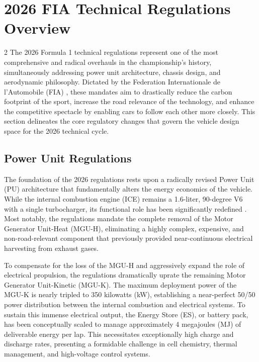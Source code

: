 \section{2026 FIA Technical Regulations Overview}

\begin{multicols}{2}
The 2026 Formula 1 technical regulations represent one of the most comprehensive and radical overhauls in the championship's history, simultaneously addressing power unit architecture, chassis design, and aerodynamic philosophy. Dictated by the Federation Internationale de l'Automobile (FIA) \cite{FIA_2026_Technical_Regulations}, these mandates aim to drastically reduce the carbon footprint of the sport, increase the road relevance of the technology, and enhance the competitive spectacle by enabling cars to follow each other more closely. This section delineates the core regulatory changes that govern the vehicle design space for the 2026 technical cycle.

\subsection{Power Unit Regulations}

The foundation of the 2026 regulations rests upon a radically revised Power Unit (PU) architecture that fundamentally alters the energy economics of the vehicle. While the internal combustion engine (ICE) remains a 1.6-liter, 90-degree V6 with a single turbocharger, its functional role has been significantly redefined \cite{FIA_2026_PU_Regulations}. Most notably, the regulations mandate the complete removal of the Motor Generator Unit-Heat (MGU-H), eliminating a highly complex, expensive, and non-road-relevant component that previously provided near-continuous electrical harvesting from exhaust gases.

To compensate for the loss of the MGU-H and aggressively expand the role of electrical propulsion, the regulations dramatically uprate the remaining Motor Generator Unit-Kinetic (MGU-K). The maximum deployment power of the MGU-K is nearly tripled to 350 kilowatts (kW), establishing a near-perfect 50/50 power distribution between the internal combustion and electrical systems. To sustain this immense electrical output, the Energy Store (ES), or battery pack, has been conceptually scaled to manage approximately 4 megajoules (MJ) of deliverable energy per lap. This necessitates exceptionally high charge and discharge rates, presenting a formidable challenge in cell chemistry, thermal management, and high-voltage control systems.


\end{multicols}
